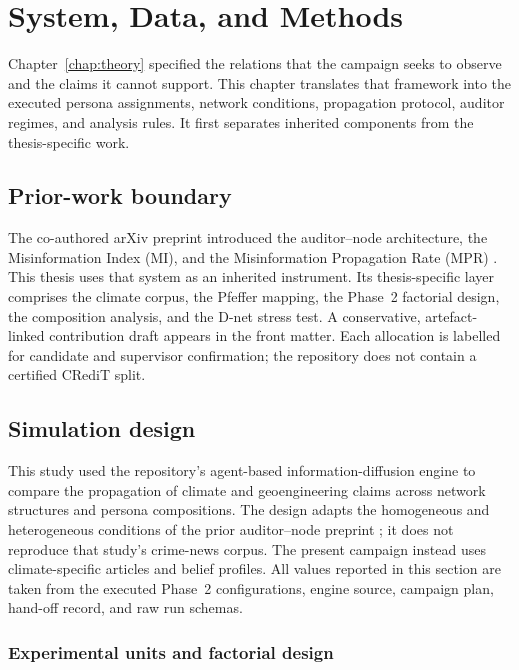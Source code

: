 \chapter{System, Data, and Methods}
\label{chap:methods}
\sloppy

Chapter~\ref{chap:theory} specified the relations that the campaign seeks to
observe and the claims it cannot support. This chapter translates that
framework into the executed persona assignments, network conditions,
propagation protocol, auditor regimes, and analysis rules. It first separates
inherited components from the thesis-specific work.

\section{Prior-work boundary}
The co-authored arXiv preprint introduced the auditor--node architecture, the Misinformation Index (MI), and the Misinformation Propagation Rate (MPR) \parencite{maurya2025simulating}. This thesis uses that system as an inherited instrument. Its thesis-specific layer comprises the climate corpus, the Pfeffer mapping, the Phase~2 factorial design, the composition analysis, and the D-net stress test. A conservative, artefact-linked contribution draft appears in the front matter. Each allocation is labelled for candidate and supervisor confirmation; the repository does not contain a certified CRediT split.

\section{Simulation design}
\label{sec:methods-simulation}

This study used the repository's agent-based information-diffusion engine to
compare the propagation of climate and geoengineering claims across network
structures and persona compositions.  The design adapts the homogeneous and
heterogeneous conditions of the prior auditor--node preprint
\parencite{maurya2025simulating}; it does not reproduce that study's crime-news
corpus.  The present campaign instead uses climate-specific articles and belief
profiles.  All values reported in this section are taken from the executed
Phase~2 configurations, engine source, campaign plan, hand-off record, and raw
run schemas.

\subsection{Experimental units and factorial design}
\label{subsec:simulation-grid}


